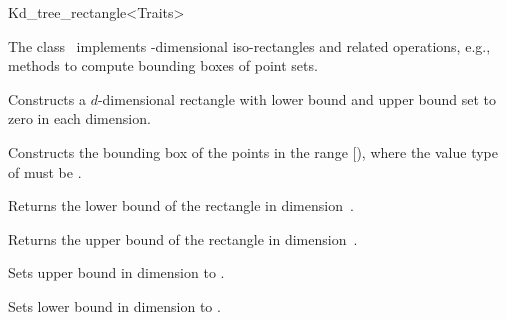 

\begin{ccRefClass}{Kd_tree_rectangle<Traits>}  %

\begin{ccAdvanced}


\ccDefinition
  
The class \ccRefName\ implements -dimensional iso-rectangles and related operations,
e.g., methods to compute bounding boxes of point sets. 




\ccTypes


\ccCreation
{}  %

{Constructs a $d$-dimensional rectangle  with lower bound and upper bound set to zero 
in each dimension.}
 
{Constructs the bounding box of the points in the range [), where the value
type of  must be .}

\ccOperations

{Returns the lower bound of the rectangle in dimension~.}

{Returns the upper bound of the rectangle in dimension~.}



{Sets upper bound in dimension  to .}

{Sets lower bound in dimension  to .}
 

\end{ccAdvanced}
\end{ccRefClass}
